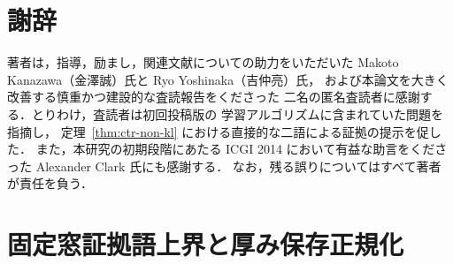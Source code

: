 \documentclass[11pt,a4paper]{ltjsarticle}
\theoremstyle{remark}
\theoremstyle{plain}
\begin{document}
\section*{謝辞}
著者は，指導，励まし，関連文献についての助力をいただいた
Makoto Kanazawa（金澤誠）氏と Ryo Yoshinaka（吉仲亮）氏，
および本論文を大きく改善する慎重かつ建設的な査読報告をくださった
二名の匿名査読者に感謝する．とりわけ，査読者は初回投稿版の
学習アルゴリズムに含まれていた問題を指摘し，
定理~\ref{thm:ctr-non-kl} における直接的な二語による証拠の提示を促した．
また，本研究の初期段階にあたる ICGI 2014 において有益な助言をくださった
Alexander Clark 氏にも感謝する．
なお，残る誤りについてはすべて著者が責任を負う．

\appendix
\section{固定窓証拠語上界と厚み保存正規化}
\label{app:fixed-window-bounds}
\end{document}
